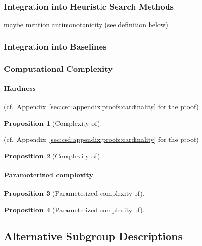 \documentclass{article}
\newtheorem{proposition}{Proposition}
\theoremstyle{definition}
\begin{document}
\subsubsection{Integration into Heuristic Search Methods}
\label{sec:csd:approach:cardinality:heuristics}

maybe mention antimonotonicity (see definition below)

\subsubsection{Integration into Baselines}
\label{sec:csd:approach:cardinality:baselines}

\subsubsection{Computational Complexity}
\label{sec:csd:approach:cardinality:complexity}

\paragraph{Hardness}

(cf.~Appendix~\ref{sec:csd:appendix:proofs:cardinality} for the proof)

\begin{proposition}[Complexity of]
	\label{prop:csd:complexity-cardinality-perfect-box}
\end{proposition}

(cf.~Appendix~\ref{sec:csd:appendix:proofs:cardinality} for the proof)

\begin{proposition}[Complexity of]
	\label{prop:csd:complexity-cardinality-imperfect-box}
\end{proposition}

\paragraph{Parameterized complexity}

\begin{proposition}[Parameterized complexity of]
	\label{prop:csd:complexity-unconstrained-xp}
\end{proposition}

\begin{proposition}[Parameterized complexity of]
	\label{prop:csd:complexity-cardinality-xp}
\end{proposition}

\subsection{Alternative Subgroup Descriptions}
\label{sec:csd:approach:alternatives}
\end{document}
